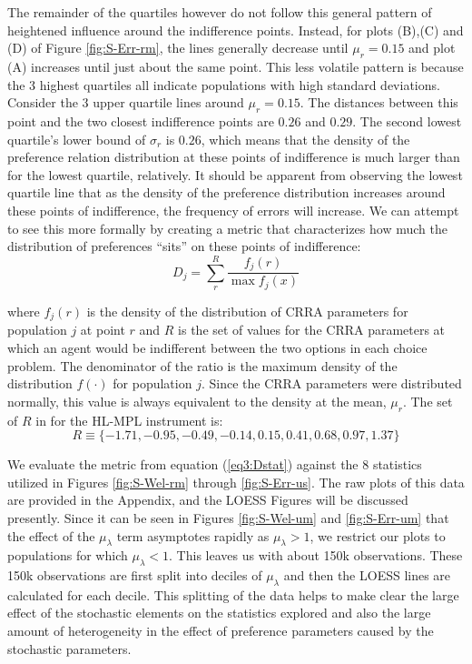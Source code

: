 \documentclass[../main.tex]{subfiles}
\begin{document}
The remainder of the quartiles however do not follow this general pattern of heightened influence around the indifference points.
Instead, for plots (B),(C) and (D) of Figure \ref{fig:S-Err-rm}, the lines generally decrease until $\mu_r = 0.15$ and plot (A) increases until just about the same point.
This less volatile pattern is because the 3 highest quartiles all indicate populations with high standard deviations.
Consider the 3 upper quartile lines around $\mu_r = 0.15$.
The distances between this point and the two closest indifference points are $0.26$ and $0.29$.
The second lowest quartile's lower bound of $\sigma_r$ is $0.26$, which means that the density of the preference relation distribution at these points of indifference is much larger than for the lowest quartile, relatively.
It should be apparent from observing the lowest quartile line that as the density of the preference distribution increases around these points of indifference, the frequency of errors will increase.
We can attempt to see this more formally by creating a metric that characterizes how much the distribution of preferences \enquote{sits} on these points of indifference:
\begin{equation}
	\label{eq3:Dstat}
	D_j = \sum_r^R \frac{f_j(r)}{\max f_j(x)}
\end{equation}

\noindent where $f_j(r)$ is the density of the distribution of CRRA parameters for population $j$ at point $r$ and $R$ is the set of values for the CRRA parameters at which an agent would be indifferent between the two options in each choice problem.
The denominator of the ratio is the maximum density of the distribution $f(\cdot)$ for population $j$.
Since the CRRA parameters were distributed normally, this value is always equivalent to the density at the mean, $\mu_r$.
The set of $R$ in for the HL-MPL instrument is:
\begin{equation}
	R \equiv \{-1.71, -0.95, -0.49, -0.14, 0.15, 0.41, 0.68, 0.97, 1.37\}
\end{equation}

We evaluate the metric from equation (\ref{eq3:Dstat}) against the 8 statistics utilized in Figures \ref{fig:S-Wel-rm} through \ref{fig:S-Err-us}.
The raw plots of this data are provided in the Appendix, and the LOESS Figures will be discussed presently.
Since it can be seen in Figures \ref{fig:S-Wel-um} and \ref{fig:S-Err-um} that the effect of the $\mu_\lambda$ term asymptotes rapidly as $\mu_\lambda > 1$, we restrict our plots to populations for which $\mu_\lambda < 1$.
This leaves us with about 150k observations.
These 150k observations are first split into deciles of $\mu_\lambda$ and then the LOESS lines are calculated for each decile.
This splitting of the data helps to make clear the large effect of the stochastic elements on the statistics explored and also the large amount of heterogeneity in the effect of preference parameters caused by the stochastic parameters.
\end{document}
